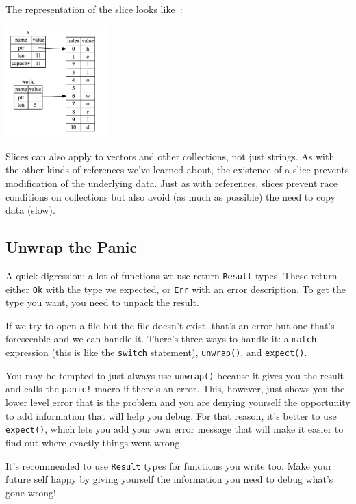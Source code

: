 \documentclass[a4paper]{report}
\begin{document}
The representation of the slice looks like~\cite{rustdocs}:
\begin{center}
	\includegraphics[width=0.3\textwidth]{images/string-slice.png}
\end{center}

Slices can also apply to vectors and other collections, not just strings. As with the other kinds of references we've learned about, the existence of a slice prevents modification of the underlying data. Just as with references, slices prevent race conditions on collections but also avoid (as much as possible) the need to copy data (slow).

\subsection*{Unwrap the Panic}
A quick digression: a lot of functions we use return \texttt{Result} types. These return either \texttt{Ok} with the type we expected, or \texttt{Err} with an error description. To get the type you want, you need to unpack the result.

If we try to open a file but the file doesn't exist, that's an error but one that's foreseeable and we can handle it. There's three ways to handle it: a \texttt{match} expression (this is like the \texttt{switch} statement), \texttt{unwrap()}, and \texttt{expect()}. 

You may be tempted to just always use \texttt{unwrap()} because it gives you the result and calls the \texttt{panic!} macro if there's an error. This, however, just shows you the lower level error that is the problem and you are denying yourself the opportunity to add information that will help you debug. For that reason, it's better to use \texttt{expect()}, which lets you add your own error message that will make it easier to find out where exactly things went wrong.

It's recommended to use \texttt{Result} types for functions you write too. Make your future self happy by giving yourself the information you need to debug what's gone wrong!
\end{document}
